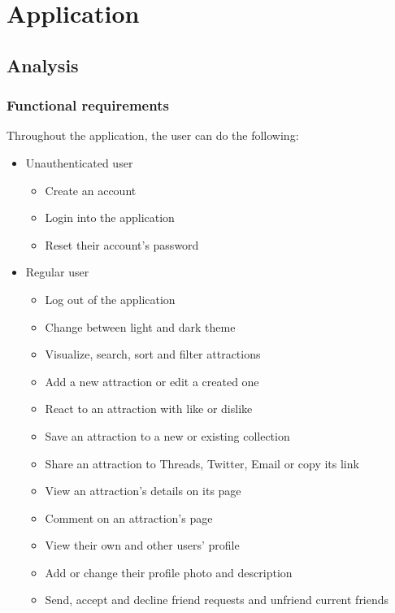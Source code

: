 \chapter{Application}
\label{chap:ch4}

\section{Analysis}

\subsection{Functional requirements}

\par Throughout the application, the user can do the following:

\begin{itemize}
    \item Unauthenticated user
    \begin{itemize}
        \item Create an account
        \item Login into the application
        \item Reset their account's password
    \end{itemize}
    \item Regular user
    \begin{itemize}
        \item Log out of the application
        \item Change between light and dark theme
        \item Visualize, search, sort and filter attractions
        \item Add a new attraction or edit a created one
        \item React to an attraction with like or dislike
        \item Save an attraction to a new or existing collection
        \item Share an attraction to Threads, Twitter, Email or copy its link
        \item View an attraction's details on its page
        \item Comment on an attraction's page
        \item View their own and other users' profile
        \item Add or change their profile photo and description
        \item Send, accept and decline friend requests and unfriend current friends

\end{itemize}
\end{itemize}
